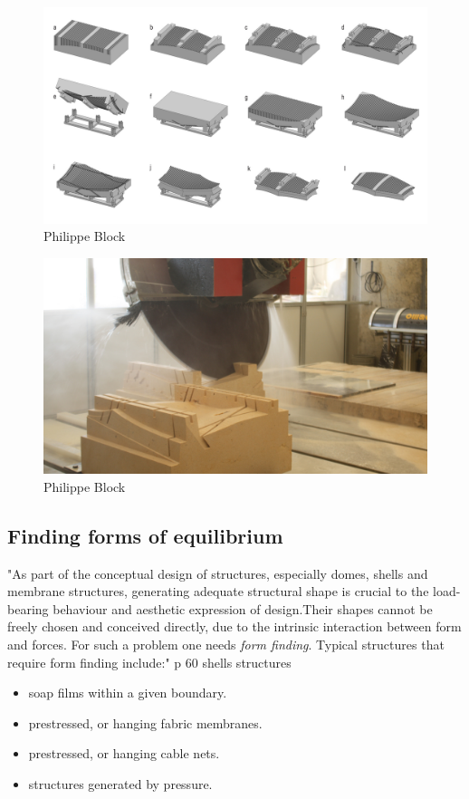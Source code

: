 \begin{figure}[H]
\centering
\includegraphics[width=0.9\linewidth ]{figure/Introduction/digitalstereotomyBlock.jpg}
\caption{Philippe Block}
\end{figure}

\begin{figure}[H]
\centering
\includegraphics[width=0.8\linewidth ]{figure/Introduction/digitalstereotomyBlock2.jpg}
\caption{Philippe Block}
\end{figure}


\subsection{Finding forms of equilibrium}

"As part of the conceptual design of structures, especially domes, shells and membrane structures, generating adequate structural shape is crucial to the load-bearing behaviour and aesthetic  expression of design.Their shapes cannot be freely chosen and conceived directly, due to the intrinsic interaction between form and forces. For such a problem one needs \textit{form finding}. Typical structures that require form finding include:" p 60 shells structures

\begin{itemize}
\item soap films within a given boundary.
\item prestressed, or hanging fabric membranes.
\item prestressed, or hanging cable nets.
\item structures generated by pressure.
\end{itemize}

